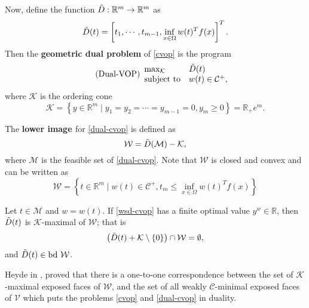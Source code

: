 \documentclass[10pt,xcolor={table,dvipsnames},t,unknownkeysallowed]{beamer}
\newcommand{\R}{\mathbb{R}}
\newcommand{\cone}[1]{\mathcal{#1}}
\begin{document}
\begin{frame}{}
Now, define the function $\Tilde{D}:\R^m\to\R^m$ as
    \[
    \Tilde{D}(t) = \left[t_1,\cdots,t_{m-1}, \inf_{x\in\Omega}w(t)^T f(x)\right]^T.
    \]
    Then the \textbf{\alert{geometric dual problem}} of \eqref{cvop} is the program
    \begin{equation}\label{dual-cvop} \tag{Dual-VOP}
      \begin{array}{ll}
        \max_{\cone{K}}& \Tilde{D}(t)\\
        \text{subject to}& w(t)\in \cone{C}^+,
      \end{array}
    \end{equation}
 where $\cone{K}$ is the ordering cone 
 \[
 \cone{K} = \left\{y\in \R^m\;|\; y_1=y_2=\cdots=y_{m-1}=0, y_m\geq 0\right\} = \R_+e^m.
 \]
 
\end{frame}

\begin{frame}{}
The \textbf{\alert{lower image }} for \eqref{dual-cvop} is defined as
 \[
 \cone{W} = \Tilde{D}(\cone{M}) - \cone{K},
 \]
 where $\cone{M}$ is the feasible set of \eqref{dual-cvop}. Note that $\cone{W}$ is closed and convex and can be written as
     \begin{equation}\label{lower_img}
     \cone{W} = \left\{t\in\R^m\;|\; w(t)\in \cone{C}^+, t_m\leq \inf_{x\in\Omega}w(t)^T f(x) \right\}
     \end{equation}
        \begin{proposition}
    Let $t\in\cone{M}$ and $w=w(t)$. If \eqref{wsd-cvop} has a finite optimal value $y^w\in \R$, then $\Tilde{D}(t)$ is $\cone{K}$-maximal of $\cone{W}$; that is 
    \[
    \left(\Tilde{D}(t)+\cone{K}\setminus\{0\}\right)\cap \cone{W} =\emptyset,
    \] 
    and $\Tilde{D}(t)\in \text{bd }\cone{W}$.
    \end{proposition}
    {\small
     \begin{remark}
    Heyde in \cite{aHeyde2013},  proved that there is a one-to-one correspondence between the set of $\cone{K}$-maximal exposed faces of $\cone{W}$, and the set of all weakly $\cone{C}$-minimal exposed faces of $\cone{V}$ which puts the problems \eqref{cvop} and \eqref{dual-cvop} in duality.
    \end{remark}}
\end{frame}
\end{document}
